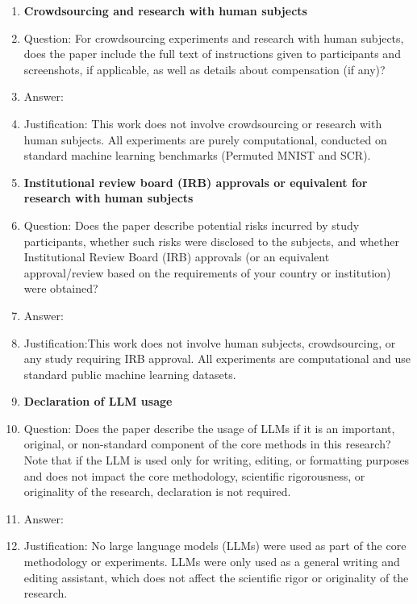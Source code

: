 \documentclass{article}
\begin{document}
\begin{enumerate}
\item {\bf Crowdsourcing and research with human subjects}
    \item[] Question: For crowdsourcing experiments and research with human subjects, does the paper include the full text of instructions given to participants and screenshots, if applicable, as well as details about compensation (if any)? 
    \item[] Answer:  \answerNA{} %
    \item[] Justification:  This work does not involve crowdsourcing or research with human subjects. All experiments are purely computational, conducted on standard machine learning benchmarks (Permuted MNIST and SCR).  

\item {\bf Institutional review board (IRB) approvals or equivalent for research with human subjects}
    \item[] Question: Does the paper describe potential risks incurred by study participants, whether such risks were disclosed to the subjects, and whether Institutional Review Board (IRB) approvals (or an equivalent approval/review based on the requirements of your country or institution) were obtained?
    \item[] Answer: \answerNA{}   %
    \item[] Justification:This work does not involve human subjects, crowdsourcing, or any study requiring IRB approval. All experiments are computational and use standard public machine learning datasets.  


\item {\bf Declaration of LLM usage}
    \item[] Question: Does the paper describe the usage of LLMs if it is an important, original, or non-standard component of the core methods in this research? Note that if the LLM is used only for writing, editing, or formatting purposes and does not impact the core methodology, scientific rigorousness, or originality of the research, declaration is not required.
    \item[] Answer: \answerNA{}   %
    \item[] Justification: No large language models (LLMs) were used as part of the core methodology or experiments. LLMs were only used as a general writing and editing assistant, which does not affect the scientific rigor or originality of the research.  


\end{enumerate}
\end{document}
